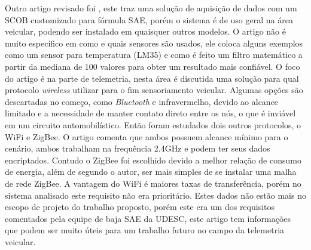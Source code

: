Outro artigo revisado foi , este traz uma solução de aquisição de dados com um SCOB customizado para fórmula SAE, porém o sistema é de uso geral na área veicular, podendo ser instalado em quaisquer outros modelos. O artigo não é muito específico em como e quais sensores são usados, ele coloca alguns exemplos como um sensor para temperatura (LM35) e como é feito um filtro matemático a partir da mediana de 100 valores para obter um resultado mais confiável. O foco do artigo é na parte de telemetria, nesta área é discutida uma solução para qual protocolo \textit{wireless} utilizar para o fim sensoriamento veicular. Algumas opções são descartadas no começo, como \textit{Bluetooth} e infravermelho, devido ao alcance limitado e a necessidade de manter contato direto entre os nós, o que é inviável em um circuito automobilístico. Então foram estudados dois outros protocolos, o WiFi e ZigBee. O artigo comenta que ambos possuem alcance mínimo para o cenário, ambos trabalham na frequência 2.4GHz e podem ter seus dados encriptados. Contudo o ZigBee foi escolhido devido a melhor relação de consumo de energia, além de segundo o autor, ser mais simples de se instalar uma malha de rede ZigBee. A vantagem do WiFi é maiores taxas de transferência, porém no sistema analisado este requisito não era prioritário. Estes dados não estão mais no escopo de projeto do trabalho proposto, porém este era um dos requisitos comentados pela equipe de baja SAE da UDESC, este artigo tem informações que podem ser muito úteis para um trabalho futuro no campo da telemetria veicular.         


